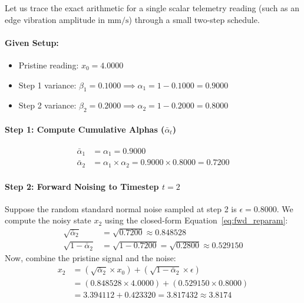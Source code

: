 \begin{example}
Let us trace the exact arithmetic for a single scalar telemetry reading (such as an edge vibration amplitude in $\text{mm/s}$) through a small two-step schedule.

\paragraph{Given Setup:}
\begin{itemize}
    \item Pristine reading: $x_0 = 4.0000$
    \item Step 1 variance: $\beta_1 = 0.1000 \implies \alpha_1 = 1 - 0.1000 = 0.9000$
    \item Step 2 variance: $\beta_2 = 0.2000 \implies \alpha_2 = 1 - 0.2000 = 0.8000$
\end{itemize}

\paragraph{Step 1: Compute Cumulative Alphas ($\bar{\alpha}_t$)}
\begin{align*}
\bar{\alpha}_1 &= \alpha_1 = 0.9000\\
\bar{\alpha}_2 &= \alpha_1 \times \alpha_2 = 0.9000 \times 0.8000 = 0.7200
\end{align*}

\paragraph{Step 2: Forward Noising to Timestep $t = 2$}
Suppose the random standard normal noise sampled at step 2 is $\epsilon = 0.8000$. 
We compute the noisy state $x_2$ using the closed-form Equation~\eqref{eq:fwd_reparam}:
\begin{align*}
\sqrt{\bar{\alpha}_2} &= \sqrt{0.7200} \approx 0.848528\\
\sqrt{1 - \bar{\alpha}_2} &= \sqrt{1 - 0.7200} = \sqrt{0.2800} \approx 0.529150
\end{align*}
Now, combine the pristine signal and the noise:
\begin{align*}
x_2 &= \left(\sqrt{\bar{\alpha}_2} \times x_0\right) + \left(\sqrt{1 - \bar{\alpha}_2} \times \epsilon\right)\\
    &= (0.848528 \times 4.0000) + (0.529150 \times 0.8000)\\
    &= 3.394112 + 0.423320 = 3.817432 \approx 3.8174
\end{align*}


\end{example}
